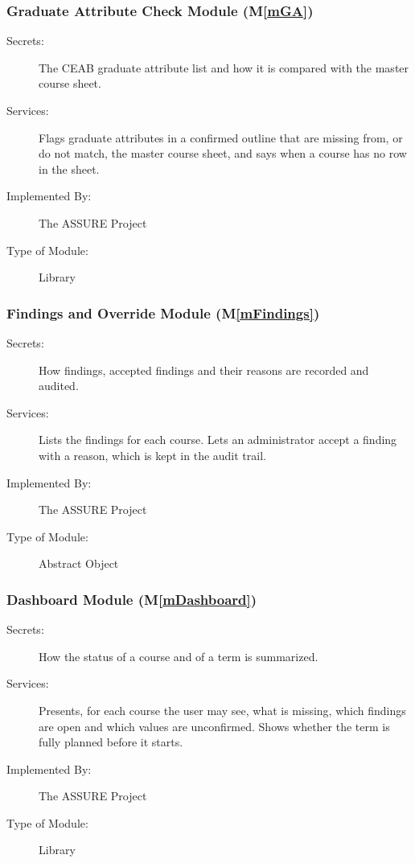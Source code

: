 \documentclass[12pt, titlepage]{article}
\newcommand{\sysname}{The ASSURE Project}
\newcommand{\mref}[1]{M\ref{#1}}
\begin{document}
\subsubsection{Graduate Attribute Check Module (\mref{mGA})}

\begin{description}
\item[Secrets:] The CEAB graduate attribute list and how it is compared with the master course
sheet.
\item[Services:] Flags graduate attributes in a confirmed outline that are missing from, or do not
match, the master course sheet, and says when a course has no row in the sheet.
\item[Implemented By:] \sysname
\item[Type of Module:] Library
\end{description}

\subsubsection{Findings and Override Module (\mref{mFindings})}

\begin{description}
\item[Secrets:] How findings, accepted findings and their reasons are recorded and audited.
\item[Services:] Lists the findings for each course. Lets an administrator accept a finding with a
reason, which is kept in the audit trail.
\item[Implemented By:] \sysname
\item[Type of Module:] Abstract Object
\end{description}

\subsubsection{Dashboard Module (\mref{mDashboard})}

\begin{description}
\item[Secrets:] How the status of a course and of a term is summarized.
\item[Services:] Presents, for each course the user may see, what is missing, which findings are open
and which values are unconfirmed. Shows whether the term is fully planned before it starts.
\item[Implemented By:] \sysname
\item[Type of Module:] Library
\end{description}
\end{document}
